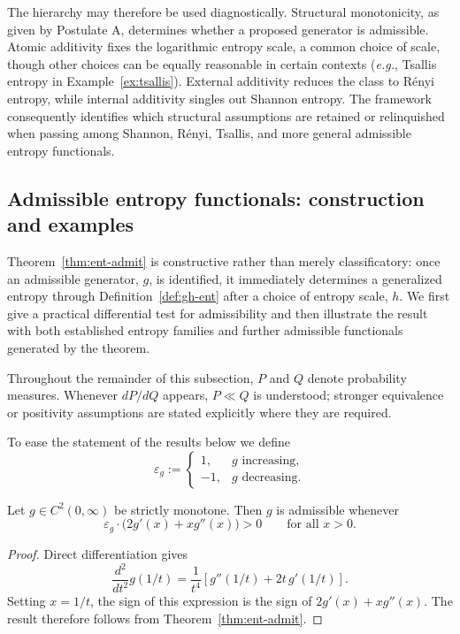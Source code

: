 \documentclass[reqno]{amsart}
\begin{document}
The hierarchy may therefore be used diagnostically. Structural
monotonicity, as given by Postulate A, determines whether a proposed generator is admissible.
Atomic additivity fixes the logarithmic entropy scale, a common choice of scale, though other choices can be equally reasonable in certain contexts ({\it e.g.}, Tsallis entropy in Example~\ref{ex:tsallis}). External additivity reduces the class to R\'enyi entropy, while internal
additivity singles out Shannon entropy. The framework consequently
identifies which structural assumptions are retained or relinquished when passing among Shannon, R\'enyi, Tsallis, and more general admissible entropy functionals.

\subsection{Admissible entropy functionals: construction and examples}
\label{subsec:admissible-examples}

Theorem~\ref{thm:ent-admit} is constructive rather than merely
classificatory: once an admissible generator, $g$, is identified, it
immediately determines a generalized entropy through
Definition~\ref{def:gh-ent} after a choice of entropy scale, $h$. We first give a practical differential
test for admissibility and then illustrate the result with both established
entropy families and further admissible functionals generated by the
theorem. 

Throughout the remainder of this subsection, $P$ and $Q$ denote
probability measures. Whenever $dP/dQ$ appears, $P\ll Q$ is understood;
stronger equivalence or positivity assumptions are stated explicitly where
they are required.

To ease the statement of the results below we define
$$
\varepsilon_g
:=
\begin{cases}
1, & g \textrm{ increasing},\\
-1, & g \textrm{ decreasing}.
\end{cases}
$$

\begin{cor}
\label{cor:differential-admissibility}
Let $g\in C^2(0,\infty)$ be strictly monotone. Then $g$ is admissible whenever
$$
\varepsilon_g \cdot\big(2g'(x)+xg''(x) \big)>0
\qquad
\text{for all }x>0.
$$
\end{cor}

\begin{proof}
Direct differentiation gives
$$
\frac{d^2}{dt^2}g(1/t)
=
\frac{1}{t^4}
\left[
g''(1/t)+2t\,g'(1/t)
\right].
$$
Setting $x=1/t$, the sign of this expression is the sign of $2g'(x)+xg''(x)$.
The result therefore follows from Theorem~\ref{thm:ent-admit}.
\end{proof}
\end{document}
